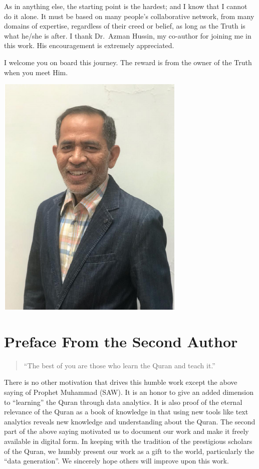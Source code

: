 \documentclass[
]{article}
\begin{document}
As in anything else, the starting point is the hardest; and I know that I cannot do it alone. It must be based on many people's collaborative network, from many domains of expertise, regardless of their creed or belief, as long as the Truth is what he/she is after. I thank Dr.~Azman Hussin, my co-author for joining me in this work. His encouragement is extremely appreciated.

I welcome you on board this journey. The reward is from the owner of the Truth when you meet Him.

\begin{center}\includegraphics{00-index_files/figure-latex/unnamed-chunk-2-1} \end{center}

\hypertarget{preface-from-the-second-author}{%
\section*{Preface From the Second Author}\label{preface-from-the-second-author}}

\begin{quote}
``The best of you are those who learn the Quran and teach it.''
\end{quote}

There is no other motivation that drives this humble work except the above saying of Prophet Muhammad (SAW). It is an honor to give an added dimension to ``learning'' the Quran through data analytics. It is also proof of the eternal relevance of the Quran as a book of knowledge in that using new tools like text analytics reveals new knowledge and understanding about the Quran. The second part of the above saying motivated us to document our work and make it freely available in digital form. In keeping with the tradition of the prestigious scholars of the Quran, we humbly present our work as a gift to the world, particularly the ``data generation''. We sincerely hope others will improve upon this work.
\end{document}
